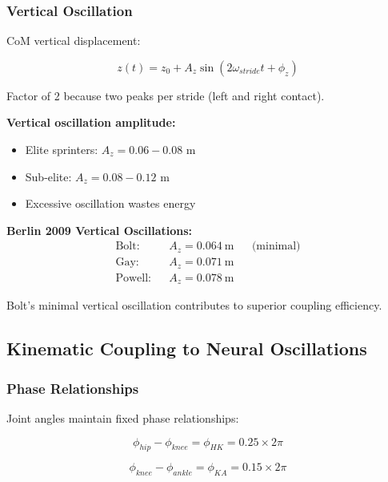 \subsubsection{Vertical Oscillation}

CoM vertical displacement:

\begin{equation}
z(t) = z_0 + A_z \sin(2\omega_{stride} t + \phi_z)
\label{eq:vertical_oscillation}
\end{equation}

Factor of 2 because two peaks per stride (left and right contact).

\textbf{Vertical oscillation amplitude:}
\begin{itemize}
\item Elite sprinters: $A_z = 0.06-0.08$ m
\item Sub-elite: $A_z = 0.08-0.12$ m
\item Excessive oscillation wastes energy
\end{itemize}

\textbf{Berlin 2009 Vertical Oscillations:}
\begin{align}
\text{Bolt:} && A_z = 0.064~\text{m} && \text{(minimal)} \\
\text{Gay:} && A_z = 0.071~\text{m} \\
\text{Powell:} && A_z = 0.078~\text{m}
\end{align}

Bolt's minimal vertical oscillation contributes to superior coupling efficiency.

\subsection{Kinematic Coupling to Neural Oscillations}

\subsubsection{Phase Relationships}

Joint angles maintain fixed phase relationships:

\begin{equation}
\phi_{hip} - \phi_{knee} = \phi_{HK} = 0.25 \times 2\pi
\label{eq:hip_knee_phase}
\end{equation}

\begin{equation}
\phi_{knee} - \phi_{ankle} = \phi_{KA} = 0.15 \times 2\pi
\label{eq:knee_ankle_phase}
\end{equation}

